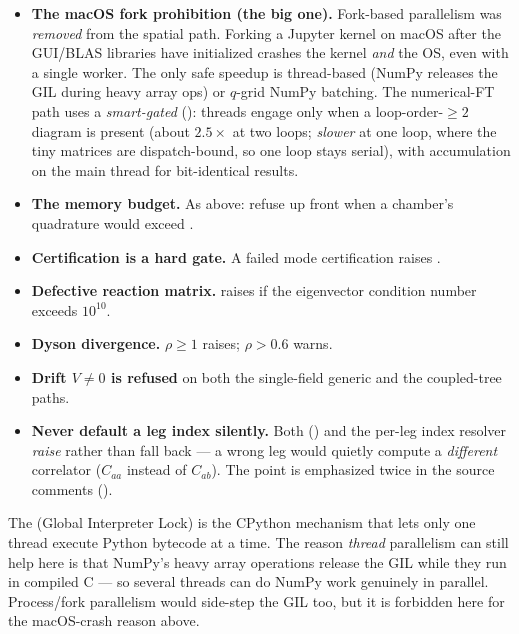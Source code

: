 \begin{itemize}
  \item \textbf{The macOS fork prohibition (the big one).} Fork-based parallelism
        was \emph{removed} from the spatial path. Forking a Jupyter kernel on
        macOS after the GUI/BLAS libraries have initialized crashes the kernel
        \emph{and} the OS, even with a single worker. The only safe speedup is
        thread-based (NumPy releases the GIL during heavy array ops) or
        $q$-grid NumPy batching. The numerical-FT path uses a
        \emph{smart-gated} 
        (): threads engage only when a
        loop-order-$\ge2$ diagram is present (about $2.5\times$ at two loops;
        \emph{slower} at one loop, where the tiny matrices are dispatch-bound, so
        one loop stays serial), with accumulation on the main thread for
        bit-identical results.
  \item \textbf{The memory budget.} As above: refuse up front when a chamber's
        quadrature would exceed .
  \item \textbf{Certification is a hard gate.} A failed mode certification raises
        .
  \item \textbf{Defective reaction matrix.}  raises if
        the eigenvector condition number exceeds $10^{10}$.
  \item \textbf{Dyson divergence.} $\rho\ge1$ raises; $\rho>0.6$ warns.
  \item \textbf{Drift $V\ne0$ is refused} on both the single-field generic and the
        coupled-tree paths.
  \item \textbf{Never default a leg index silently.} Both
         () and the
        per-leg index resolver \emph{raise} rather than fall back --- a wrong leg
        would quietly compute a \emph{different} correlator ($C_{aa}$ instead of
        $C_{ab}$). The point is emphasized twice in the source comments
        ().
\end{itemize}

\begin{defn}
The  (Global Interpreter Lock) is the CPython mechanism that lets only
one thread execute Python bytecode at a time. The reason \emph{thread}
parallelism can still help here is that NumPy's heavy array operations release
the GIL while they run in compiled C --- so several threads can do NumPy work
genuinely in parallel. Process/fork parallelism would side-step the GIL too, but
it is forbidden here for the macOS-crash reason above.
\end{defn}

